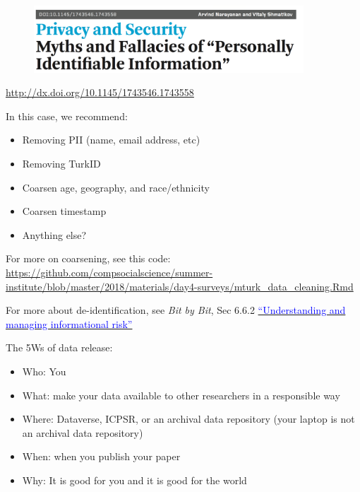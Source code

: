 \documentclass[aspectratio=169]{beamer}
\begin{document}
\begin{frame}

\begin{figure}
  \centering
  \includegraphics[width=0.9\textwidth]{figures/narayanan_myths_2010_title}
\end{figure}

\vfill
\url{http://dx.doi.org/10.1145/1743546.1743558}
\end{frame}
\begin{frame}

In this case, we recommend:
\begin{itemize}
\item Removing PII (name, email address, etc)
\item Removing TurkID
\item Coarsen age, geography, and race/ethnicity
\item Coarsen timestamp
\item Anything else?
\end{itemize}

For more on coarsening, see this code:\\
\url{https://github.com/compsocialscience/summer-institute/blob/master/2018/materials/day4-surveys/mturk_data_cleaning.Rmd}

\end{frame}
\begin{frame}

For more about de-identification, see \textit{Bit by Bit}, Sec 6.6.2 \href{https://www.bitbybitbook.com/en/1st-ed/ethics/dilemmas/info-risk/}{\textcolor{blue}{``Understanding and managing informational risk''}}

\end{frame}
\begin{frame}

The 5Ws of data release: \pause
\begin{itemize}
\item Who: You
\pause
\item What: make your data available to other researchers in a responsible way
\pause
\item Where: Dataverse, ICPSR, or an archival data repository \pause (your laptop is not an archival data repository)
\pause 
\item When:  when you publish your paper
\pause
\item Why: It is good for you and it is good for the world
\end{itemize}

\end{frame}
\end{document}
